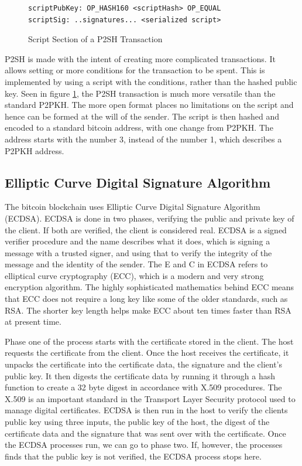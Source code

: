 \documentclass[12pt]{article}
\begin{document}
\begin{figure}[h!]
\begin{lstlisting}[numbers=none]
scriptPubKey: OP_HASH160 <scriptHash> OP_EQUAL 
scriptSig: ..signatures... <serialized script>
 \end{lstlisting}
 \caption{Script Section of a P2SH Transaction}
 \label{fig:transaction2}
\end{figure}

P2SH is made with the intent of creating more complicated transactions. It allows setting or more conditions for the transaction to be spent. This is implemented by using a script with the conditions, rather than the hashed public key. Seen in figure \ref{fig:transaction2}, the P2SH transaction is much more versatile than the standard P2PKH. The more open format places no limitations on the script and hence can be formed at the will of the sender. The script is then hashed and encoded to a standard bitcoin address, with one change from P2PKH. The address starts with the number 3, instead of the number 1, which describes a P2PKH address. 

\subsection{Elliptic Curve Digital Signature Algorithm}\label{subsec:ecdsa}
The bitcoin blockchain uses Elliptic Curve Digital Signature Algorithm (ECDSA). ECDSA is done in two phases, verifying the public and private key of the client. If both are verified, the client is considered real. ECDSA is a signed verifier procedure and the name describes what it does, which is signing a message with a trusted signer, and using that to verify the integrity of the message and the identity of the sender. The E and C in ECDSA refers to elliptical curve cryptography (ECC), which is a modern and very strong encryption algorithm. The highly sophisticated mathematics behind ECC means that ECC does not require a long key like some of the older standards, such as RSA. The shorter key length helps make ECC about ten times faster than RSA\cite{jansma2004performance} at present time. 

Phase one of the process starts with the certificate stored in the client. The host requests the certificate from the client. Once the host receives the certificate, it unpacks the certificate into the certificate data, the signature and the client's public key. It then digests the certificate data by running it through a hash function to create a 32 byte digest in accordance with X.509 procedures. The X.509 is an important standard in the Transport Layer Security protocol used to manage digital certificates. ECDSA is then run in the host to verify the clients public key using three inputs, the public key of the host, the digest of the certificate data and the signature that was sent over with the certificate. Once the ECDSA processes run, we can go to phase two. If, however, the processes finds that the public key is not verified, the ECDSA process stops here.
\end{document}
